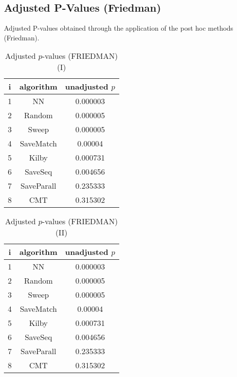 \documentclass[a4paper,10pt]{article}
\begin{document}
\begin{landscape}
\section{Adjusted P-Values (Friedman)}


Adjusted P-values obtained through the application of the post hoc methods (Friedman).

\begin{table}[!htp]
\centering\small
\begin{tabular}{ccc}
i&algorithm&unadjusted $p$\\
\hline1&NN&0.000003\\2&Random&0.000005\\3&Sweep&0.000005\\4&SaveMatch&0.00004\\5&Kilby&0.000731\\6&SaveSeq&0.004656\\7&SaveParall&0.235333\\8&CMT&0.315302\\\hline
\end{tabular}
\caption{Adjusted $p$-values (FRIEDMAN) (I)}
\end{table}
\begin{table}[!htp]
\centering\small
\begin{tabular}{ccc}
i&algorithm&unadjusted $p$\\
\hline1&NN&0.000003\\2&Random&0.000005\\3&Sweep&0.000005\\4&SaveMatch&0.00004\\5&Kilby&0.000731\\6&SaveSeq&0.004656\\7&SaveParall&0.235333\\8&CMT&0.315302\\\hline
\end{tabular}
\caption{Adjusted $p$-values (FRIEDMAN) (II)}
\end{table}

\newpage
\end{landscape}
\end{document}
